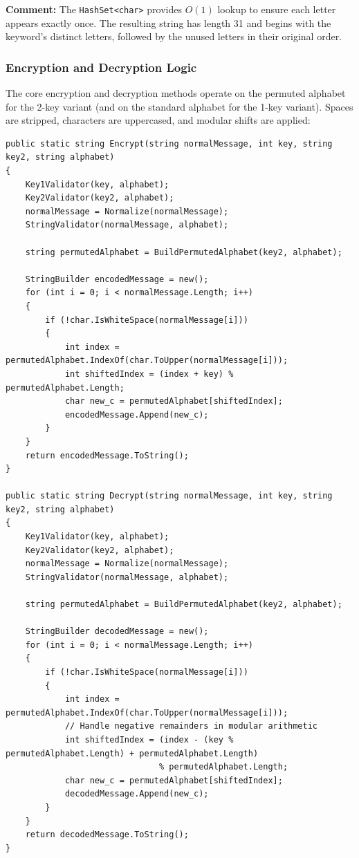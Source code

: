\documentclass[12pt,a4paper]{article}
\begin{document}
\textbf{Comment:} The \texttt{HashSet<char>} provides $O(1)$ lookup to ensure each letter appears exactly once. The resulting string has length 31 and begins with the keyword's distinct letters, followed by the unused letters in their original order.

\subsubsection{Encryption and Decryption Logic}
The core encryption and decryption methods operate on the permuted alphabet for the 2-key variant (and on the standard alphabet for the 1-key variant). Spaces are stripped, characters are uppercased, and modular shifts are applied:

\begin{lstlisting}[caption={Encryption and Decryption in CaesarCipher2Key.cs}]
public static string Encrypt(string normalMessage, int key, string key2, string alphabet)
{
    Key1Validator(key, alphabet);
    Key2Validator(key2, alphabet);
    normalMessage = Normalize(normalMessage);
    StringValidator(normalMessage, alphabet);

    string permutedAlphabet = BuildPermutedAlphabet(key2, alphabet);

    StringBuilder encodedMessage = new();
    for (int i = 0; i < normalMessage.Length; i++)
    {
        if (!char.IsWhiteSpace(normalMessage[i]))
        {
            int index = permutedAlphabet.IndexOf(char.ToUpper(normalMessage[i]));
            int shiftedIndex = (index + key) % permutedAlphabet.Length;
            char new_c = permutedAlphabet[shiftedIndex];
            encodedMessage.Append(new_c);
        }
    }
    return encodedMessage.ToString();
}

public static string Decrypt(string normalMessage, int key, string key2, string alphabet)
{
    Key1Validator(key, alphabet);
    Key2Validator(key2, alphabet);
    normalMessage = Normalize(normalMessage);
    StringValidator(normalMessage, alphabet);

    string permutedAlphabet = BuildPermutedAlphabet(key2, alphabet);

    StringBuilder decodedMessage = new();
    for (int i = 0; i < normalMessage.Length; i++)
    {
        if (!char.IsWhiteSpace(normalMessage[i]))
        {
            int index = permutedAlphabet.IndexOf(char.ToUpper(normalMessage[i]));
            // Handle negative remainders in modular arithmetic
            int shiftedIndex = (index - (key % permutedAlphabet.Length) + permutedAlphabet.Length) 
                               % permutedAlphabet.Length;
            char new_c = permutedAlphabet[shiftedIndex];
            decodedMessage.Append(new_c);
        }
    }
    return decodedMessage.ToString();
}
\end{lstlisting}
\end{document}
